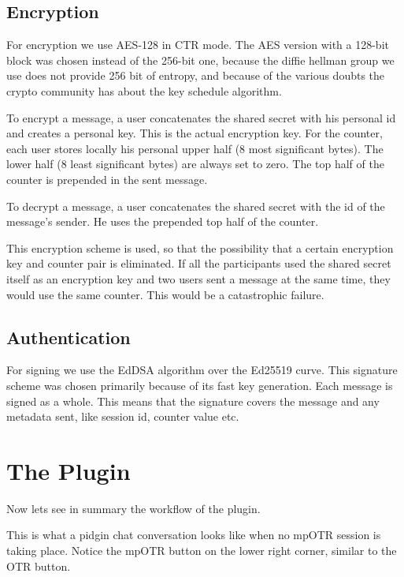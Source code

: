 \documentclass[]{article}
\begin{document}
\subsection{Encryption}
For encryption we use AES-128 in CTR mode.
The AES version with a 128-bit block was chosen instead of the 256-bit one, because the diffie hellman group we use does not provide 256 bit of entropy, and because of the various doubts the crypto community has about the key schedule algorithm.

To encrypt a message, a user concatenates the shared secret with his personal id and creates a personal key.
This is the actual encryption key.
For the counter, each user stores locally his personal upper half (8 most significant bytes).
The lower half (8 least significant bytes) are always set to zero.
The top half of the counter is prepended in the sent message.

To decrypt a message, a user concatenates the shared secret with the id of the message's sender.
He uses the prepended top half of the counter.

This encryption scheme is used, so that the possibility that a certain encryption key and counter pair is eliminated.
If all the participants used the shared secret itself as an encryption key and two users sent a message at the same time, they would use the same counter.
This would be a catastrophic failure.

\subsection{Authentication}
For signing we use the EdDSA algorithm over the Ed25519 curve.
This signature scheme was chosen primarily because of its fast key generation.
Each message is signed as a whole.
This means that the signature covers the message and any metadata sent, like session id, counter value etc.

\clearpage
\section{The Plugin}
Now lets see in summary the workflow of the plugin.

This is what a pidgin chat conversation looks like when no mpOTR session is taking place.
Notice the mpOTR button on the lower right corner, similar to the OTR button.
\end{document}

